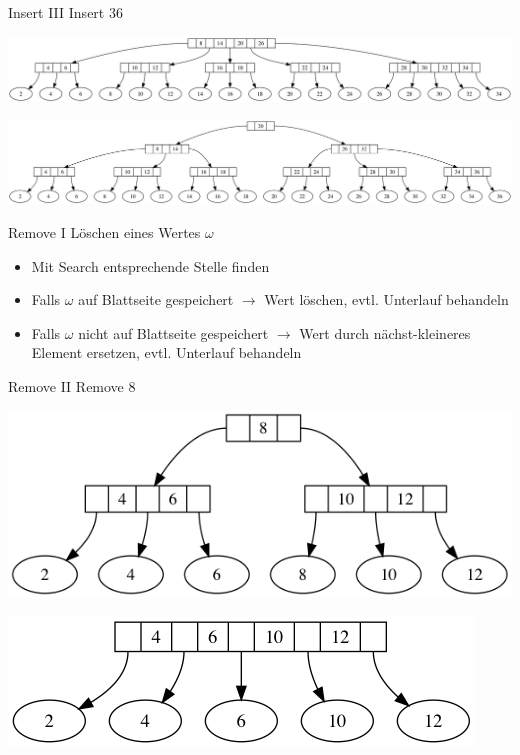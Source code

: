 \documentclass[]{beamer}
\begin{document}
\begin{frame}{Insert III}
Insert 36

\includegraphics[width=\textwidth]{example_16.png}

\vspace{1cm}
\includegraphics[width=\textwidth]{example_17.png}
\end{frame}

\begin{frame}{Remove I}
Löschen eines Wertes $\omega$
\begin{itemize}
	\item Mit Search entsprechende Stelle finden
	\item Falls $\omega$ auf Blattseite gespeichert $\rightarrow$ Wert löschen, evtl. Unterlauf behandeln
	\item Falls $\omega$ nicht auf Blattseite gespeichert $\rightarrow$ Wert durch nächst-kleineres Element ersetzen, evtl. Unterlauf behandeln
\end{itemize}
\end{frame}

\begin{frame}{Remove II}
Remove 8
\begin{center}
\includegraphics[scale=0.4]{example_5.png}

\vspace{1cm}
\includegraphics[scale=0.5]{example_6_rem.png}
\end{center}
\end{frame}
\end{document}
